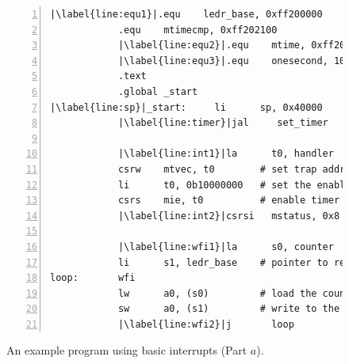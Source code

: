 \documentclass[11pt, twoside, pdftex]{article}
\begin{document}
\begin{figure}[h]
\begin{center}
\begin{minipage}[h]{15 cm}
\begin{lstlisting}[style=defaultNiosVStyle, name=ints, numbers=left, escapechar=|]
            |\label{line:equ1}|.equ    ledr_base, 0xff200000
            .equ    mtimecmp, 0xff202100
            |\label{line:equ2}|.equ    mtime, 0xff202108
            |\label{line:equ3}|.equ    onesecond, 100000000
            .text
            .global _start
|\label{line:sp}|_start:     li      sp, 0x40000      # initialize the stack location
            |\label{line:timer}|jal     set_timer        # initialize the timer
     
            |\label{line:int1}|la      t0, handler
            csrw    mtvec, t0        # set trap address
            li      t0, 0b10000000   # set the enable pattern
            csrs    mie, t0          # enable timer interrupts
            |\label{line:int2}|csrsi   mstatus, 0x8     # enable global interrupts

            |\label{line:wfi1}|la      s0, counter      # pointer to counter
            li      s1, ledr_base    # pointer to red lights
loop:       wfi
            lw      a0, (s0)         # load the counter value
            sw      a0, (s1)         # write to the lights
            |\label{line:wfi2}|j       loop
\end{lstlisting}
	\caption{An example program using basic interrupts (Part $a$).}
	\label{fig:ints}
\end{minipage}
\end{center}
\end{figure}
\end{document}
